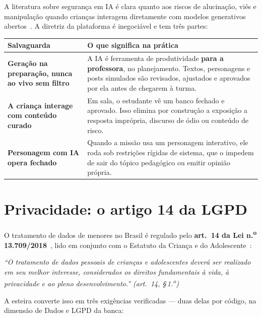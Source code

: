 \documentclass[11pt,a4paper]{article}
\begin{document}
A literatura sobre segurança em IA é clara quanto aos riscos de alucinação, viés e manipulação quando crianças interagem diretamente com modelos generativos abertos~\cite{bommasani2021}. A diretriz da plataforma é inegociável e tem três partes:

\begin{center}
\begin{tabularx}{\textwidth}{>{\sffamily\bfseries\footnotesize\color{unNavy}}p{4.6cm}X}
\toprule
\sffamily\bfseries\footnotesize\color{unNavy}Salvaguarda & \sffamily\bfseries\footnotesize\color{unNavy}O que significa na prática \\
\midrule
Geração na preparação, nunca ao vivo sem filtro & A IA é ferramenta de produtividade \textbf{para a professora}, no planejamento. Textos, personagens e posts simulados são revisados, ajustados e aprovados por ela antes de chegarem à turma. \\
\addlinespace
A criança interage com conteúdo curado & Em sala, o estudante vê um banco fechado e aprovado. Isso elimina por construção a exposição a resposta imprópria, discurso de ódio ou conteúdo de risco. \\
\addlinespace
Personagem com IA opera fechado & Quando a missão usa um personagem interativo, ele roda sob restrições rígidas de sistema, que o impedem de sair do tópico pedagógico ou emitir opinião própria. \\
\bottomrule
\end{tabularx}
\end{center}

\section{Privacidade: o artigo 14 da LGPD}

O tratamento de dados de menores no Brasil é regulado pelo \textbf{art.~14 da Lei n.\textsuperscript{o} 13.709/2018}~\cite{lgpd2018}, lido em conjunto com o Estatuto da Criança e do Adolescente~\cite{eca1990}:

\begin{destaque}
\itshape ``O tratamento de dados pessoais de crianças e adolescentes deverá ser realizado em seu melhor interesse, considerados os direitos fundamentais à vida, à privacidade e ao pleno desenvolvimento.'' \normalfont(art.~14, §\,1.\textsuperscript{o})
\end{destaque}

A esteira converte isso em três exigências verificadas --- duas delas por código, na dimensão de Dados e LGPD da banca:
\end{document}
